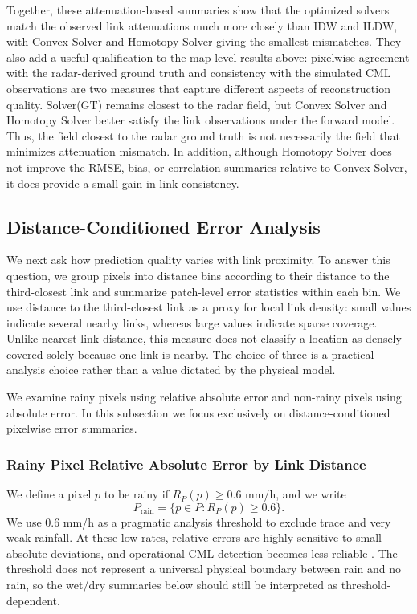 \documentclass[11pt]{article}
\begin{document}
Together, these attenuation-based summaries show that the optimized solvers match the observed link attenuations much more closely than IDW and ILDW, with Convex Solver and Homotopy Solver giving the smallest mismatches. They also add a useful qualification to the map-level results above: pixelwise agreement with the radar-derived ground truth and consistency with the simulated CML observations are two measures that capture different aspects of reconstruction quality. Solver(GT) remains closest to the radar field, but Convex Solver and Homotopy Solver better satisfy the link observations under the forward model. Thus, the field closest to the radar ground truth is not necessarily the field that minimizes attenuation mismatch. In addition, although Homotopy Solver does not improve the RMSE, bias, or correlation summaries relative to Convex Solver, it does provide a small gain in link consistency.


\subsection{Distance-Conditioned Error Analysis}
We next ask how prediction quality varies with link proximity. To answer this question, we group pixels into distance bins according to their distance to the third-closest link and summarize patch-level error statistics within each bin. {\color{black}We use distance to the third-closest link as a proxy for local link density: small values indicate several nearby links, whereas large values indicate sparse coverage. Unlike nearest-link distance, this measure does not classify a location as densely covered solely because one link is nearby. The choice of three is a practical analysis choice rather than a value dictated by the physical model.}

We examine rainy pixels using relative absolute error and non-rainy pixels using absolute error. In this subsection we focus exclusively on distance-conditioned pixelwise error summaries.

\subsubsection{Rainy Pixel Relative Absolute Error by Link Distance}
We define a pixel $p$ to be rainy if $R_P(p) \ge 0.6$ mm/h, and we write
\[
P_{\mathrm{rain}}=\{p \in P : R_P(p)\ge 0.6\}.
\]
{\color{black}We use $0.6$ mm/h as a pragmatic analysis threshold to exclude trace and very weak rainfall. At these low rates, relative errors are highly sensitive to small absolute deviations, and operational CML detection becomes less reliable \citep{polz2020rainevent}. The threshold does not represent a universal physical boundary between rain and no rain, so the wet/dry summaries below should still be interpreted as threshold-dependent.}
\end{document}
